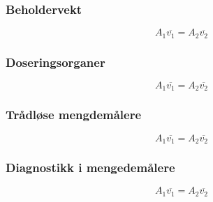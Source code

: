 \documentclass[aspectratio=169,xcolor=dvipsnames]{beamer}
\begin{document}
\begin{frame}
	\frametitle{Beholdervekt}

$$A_1 \overline{v_1} = A_2 \overline{v_2}$$
\end{frame}
\begin{frame}
	\frametitle{Doseringsorganer}

$$A_1 \overline{v_1} = A_2 \overline{v_2}$$
\end{frame}
\begin{frame}
	\frametitle{Trådløse mengdemålere}

$$A_1 \overline{v_1} = A_2 \overline{v_2}$$
\end{frame}
\begin{frame}
	\frametitle{Diagnostikk i mengedemålere}

$$A_1 \overline{v_1} = A_2 \overline{v_2}$$
\end{frame}
\end{document}
